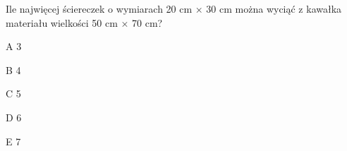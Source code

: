 \begin{tresc}
Ile najwięcej ściereczek o wymiarach 20 cm × 30 cm można wyciąć z kawałka materiału wielkości 50 cm × 70 cm?
\end{tresc}
\begin{wariant}{A} 3 \end{wariant}
\begin{wariant}{B} 4 \end{wariant}
\begin{wariant}{C} 5 \end{wariant}
\begin{wariant}{D} 6 \end{wariant}
\begin{wariant}{E} 7 \end{wariant}

